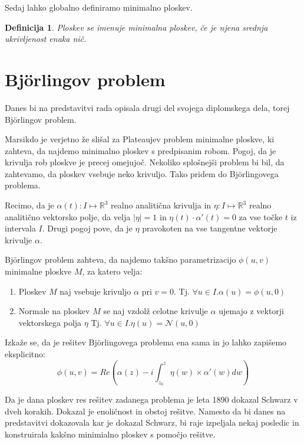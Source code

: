 \documentclass{article}
\newcommand{\R}{\mathbb{R}}
\newtheorem{definicija}{Definicija}
\begin{document}
        	Sedaj lahko globalno definiramo minimalno ploskev.
        	
        	\begin{definicija}
        	    Ploskev se imenuje \emph{minimalna ploskev}, če je njena srednja ukrivljenost enaka nič.
        	\end{definicija}


    \section{Björlingov problem}

        Danes bi na predstavitvi rada opisala drugi del svojega diplomskega dela, torej Björlingov problem.

        Marsikdo je verjetno že slišal za Plateaujev problem minimalne ploskve, ki zahteva, da najdemo minimalno
        ploskev s predpisanim robom. Pogoj, da je krivulja rob ploskve je precej omejujoč. Nekoliko splošnejši problem bi bil,
        da zahtevamo, da ploskev vsebuje neko krivuljo. Tako pridem do Björlingovega problema.

        Recimo, da je $\alpha (t) : I \mapsto \R^3$ realno analitična krivulja in $\eta : I \mapsto \R^3$ 
        realno analitično vektorsko polje, da velja $ \left\lvert \eta \right\rvert = 1$ in $\eta (t) \cdot \alpha' (t) = 0$ 
        za vse točke $t$ iz intervala $I$. Drugi pogoj pove, da je $\eta$ pravokoten na vse tangentne vektorje krivulje $\alpha$.

        Björlingov problem zahteva, da najdemo takšno parametrizacijo $\phi (u, v)$ minimalne ploskve $M$, za katero velja:
        \begin{enumerate}
            \item Ploskev $M$ naj vsebuje krivuljo $\alpha$ pri $v = 0$. Tj. $\forall u \in I. \alpha (u) = \phi (u, 0)$
            \item Normale na ploskev $M$ se naj vzdolž celotne krivulje $\alpha$ ujemajo z vektorji vektorskega polja $\eta$ 
            Tj. $\forall u \in I. \eta (u) = \mathcal{N} (u, 0)$
        \end{enumerate}

        Izkaže se, da je rešitev Björlingovega problema ena sama in jo lahko zapišemo eksplicitno:
        $$ \phi (u, v) = Re \left( \alpha (z) - i \int_{z_0}^{z} \eta (w) \times \alpha' (w) dw \right) $$

        Da je dana ploskev res rešitev zadanega problema je leta 1890 dokazal Schwarz v dveh korakih. Dokazal je enoličnost
        in obstoj rešitve. Namesto da bi danes na predstavitvi dokazovala kar je dokazal Schwarz, bi raje izpeljala nekaj posledic 
        in konstruirala kakšno minimialno ploskev s pomočjo rešitve.
\end{document}
